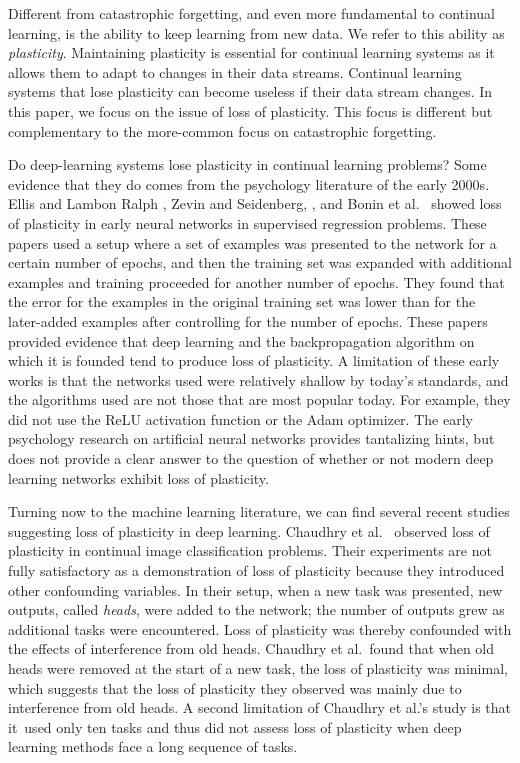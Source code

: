 \documentclass[review, number,3p]{elsarticle}
\begin{document}
Different from catastrophic forgetting, and even more fundamental to continual learning, is the ability to keep learning from new data.
We refer to this ability as \emph{plasticity}.
Maintaining plasticity is essential for continual learning systems as it allows them to adapt to changes in their data streams. 
Continual learning systems that lose plasticity can become useless if their data stream changes.
In this paper, we focus on the issue of loss of plasticity.
This focus is different but complementary to the more-common focus on catastrophic forgetting. 

Do deep-learning systems lose plasticity in continual learning problems?
Some evidence that they do comes from the psychology literature of the early 2000s. Ellis and Lambon Ralph
\cite{ellis2000age}, Zevin and Seidenberg, \cite{zevin2002}, and Bonin et al.\ \cite{bonin2004} showed loss of plasticity in early neural networks in supervised regression problems. 
These papers used a setup where a set of examples was presented to the network for a certain number of epochs, and  
then the training set was expanded with additional examples and training proceeded for another number of epochs.
They found that the error for the examples in the original training set was lower than for the later-added examples after controlling for the number of epochs.
These papers provided evidence that deep learning and the backpropagation algorithm \cite{rumelhart1986learning} on which it is founded tend to produce loss of plasticity.
A limitation of these early works is that the networks used were relatively shallow by today's standards, and the algorithms used are not those that are most popular today.
For example, they did not use the ReLU activation function or the Adam optimizer.
The early psychology research on artificial neural networks provides tantalizing hints, but does not provide a clear answer to the question of whether or not modern deep learning networks exhibit loss of plasticity.

Turning now to the machine learning literature, we can find several recent studies suggesting loss of plasticity in deep learning.
Chaudhry et al.\ \cite{intransigence2018} observed loss of plasticity in continual image classification problems.
Their experiments are not fully satisfactory as a demonstration of loss of plasticity because they introduced other confounding variables.
In their setup, when a new task was presented, new outputs, called \emph{heads}, were added to the network; the number of outputs grew as additional tasks were encountered. 
Loss of plasticity was thereby confounded with the effects of interference from old heads.
Chaudhry et al.\ found that when old heads were removed at the start of a new task, the loss of plasticity was minimal, which suggests that the loss of plasticity they observed was mainly due to interference from old heads.
A second limitation of Chaudhry et al.'s study is that it\ used only ten tasks and thus did not assess loss of plasticity when deep learning methods face a long sequence of tasks.
\end{document}

